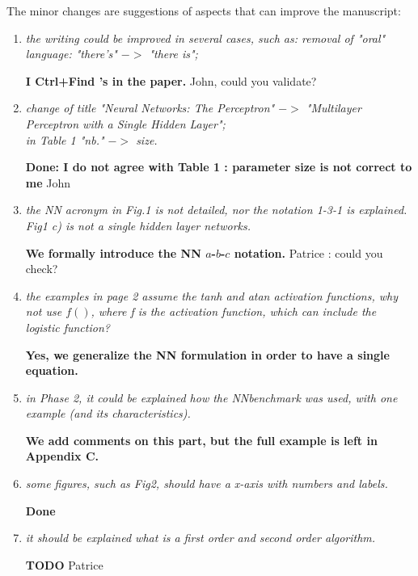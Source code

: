 \documentclass[12pt]{article}
\newcommand{\red}[1]{{\color{red}#1}}
\begin{document}
The minor changes are suggestions of aspects that can improve the manuscript:
\begin{enumerate}
\item \textit{the writing could be improved in several cases, such as: removal of "oral" language: "there’s" $->$ "there is";}

\textbf{I Ctrl+Find 's in the paper.}
\red{John, could you validate?}

\item \textit{change of title "Neural Networks: The Perceptron" $->$ "Multilayer Perceptron with a Single Hidden Layer";\\
 in Table 1 "nb." $->$ size.}
 
 \textbf{Done: I do not agree with Table 1 : parameter size is not correct to me}
\red{John}

\item \textit{the NN acronym in Fig.1 is not detailed, nor the notation 1-3-1 is explained.\\ 
Fig1 c) is not a single hidden layer networks.}

\textbf{We formally introduce the NN $a$-$b$-$c$ notation.}
\red{Patrice : could you check?}

\item \textit{the examples in page 2 assume the tanh and atan activation functions, why not use $f()$, where f is the activation function, which can include the logistic function?}

\textbf{Yes, we generalize the NN formulation in order to have a single equation.}


\item \textit{in Phase 2, it could be explained how the NNbenchmark was used, with one example (and its characteristics).}

\textbf{We add comments on this part, but the full example is left in Appendix C.}


\item \textit{some figures, such as Fig2, should have a x-axis with numbers and labels.}

\textbf{Done}


\item \textit{it should be explained what is a first order and second order algorithm.}

\textbf{TODO}
\red{Patrice}

\end{enumerate}
\end{document}
